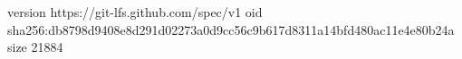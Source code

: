 version https://git-lfs.github.com/spec/v1
oid sha256:db8798d9408e8d291d02273a0d9cc56c9b617d8311a14bfd480ac11e4e80b24a
size 21884
